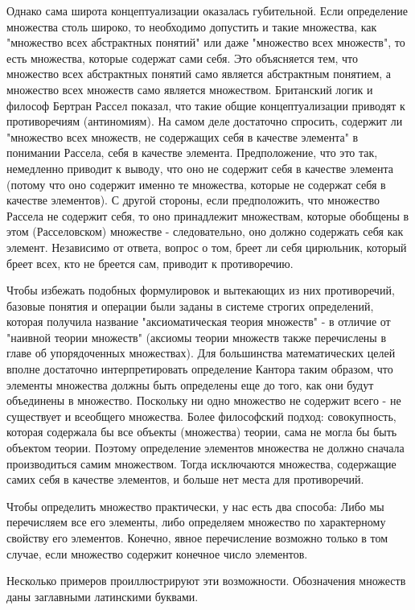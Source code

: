 Однако сама широта концептуализации оказалась губительной. Если определение множества столь широко, то необходимо допустить и такие множества, как "множество всех абстрактных понятий" или даже "множество всех множеств", то есть множества, которые содержат сами себя. Это объясняется тем, что множество всех абстрактных понятий само является абстрактным понятием, а множество всех множеств само является множеством. Британский логик и философ Бертран Рассел показал, что такие общие концептуализации приводят к противоречиям (антиномиям). На самом деле достаточно спросить, содержит ли "множество всех множеств, не содержащих себя в качестве элемента" в понимании Рассела, себя в качестве элемента. Предположение, что это так, немедленно приводит к выводу, что оно не содержит себя в качестве элемента (потому что оно содержит именно те множества, которые не содержат себя в качестве элементов). С другой стороны, если предположить, что множество Рассела не содержит себя, то оно принадлежит множествам, которые обобщены в этом (Расселовском) множестве - следовательно, оно должно содержать себя как элемент. Независимо от ответа, вопрос о том, бреет ли себя цирюльник, который бреет всех, кто не бреется сам, приводит к противоречию.

Чтобы избежать подобных формулировок и вытекающих из них противоречий, базовые понятия и операции были заданы в системе строгих определений, которая получила название "аксиоматическая теория множеств" - в отличие от "наивной теории множеств" (аксиомы теории множеств также перечислены в главе об упорядоченных множествах). Для большинства математических целей вполне достаточно интерпретировать определение Кантора таким образом, что элементы множества должны быть определены еще до того, как они будут объединены в множество. Поскольку ни одно множество не содержит всего - не существует и всеобщего множества. Более философский подход: совокупность, которая содержала бы все объекты (множества) теории, сама не могла бы быть объектом теории. Поэтому определение элементов множества не должно сначала производиться самим множеством. Тогда исключаются множества, содержащие самих себя в качестве элементов, и больше нет места для противоречий.

Чтобы определить множество практически, у нас есть два способа: Либо мы перечисляем все его элементы, либо определяем множество по характерному свойству его элементов. Конечно, явное перечисление возможно только в том случае, если множество содержит конечное число элементов.

Несколько примеров проиллюстрируют эти возможности. Обозначения множеств даны заглавными латинскими буквами.

